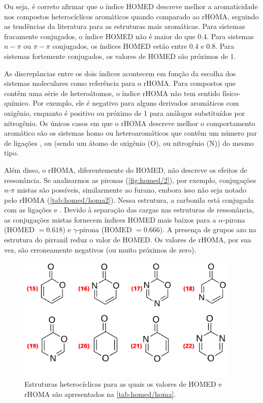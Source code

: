Ou seja, é correto afirmar que o índice \gls{HOMED} descreve melhor a aromaticidade nos compostos heterocíclicos aromáticos quando comparado ao \gls{rHOMA}, seguindo as tendências da literatura para as estruturas mais aromáticas. Para sistemas fracamente conjugados, o índice \gls{HOMED} não é maior do que 0.4. Para sistemas $n-\pi$ ou $\pi-\pi$ conjugados, os índices \gls{HOMED} estão entre 0.4 e 0.8. Para sistemas fortemente conjugados, os valores de \gls{HOMED} são próximos de 1.

As discrepâncias entre os dois índices acontecem em função da escolha dos sistemas moleculares como referência para o \gls{rHOMA}. Para compostos que contêm uma série de heteroátomos, o índice \gls{rHOMA} não tem sentido físico-químico. Por exemplo, ele é negativo para alguns derivados aromáticos com oxigênio, enquanto é positivo ou próximo de 1 para análogos substituídos por nitrogênio. Os únicos casos em que o \gls{rHOMA} descreve melhor o comportamento aromático são os sistemas homo ou heteroaromáticos que contêm um número par de ligações ,  ou  (sendo  um átomo de oxigênio (O), ou nitrogênio (N)) do mesmo tipo.

Além disso, o \gls{rHOMA}, diferentemente do \gls{HOMED}, não descreve os efeitos de ressonância. Se analisarmos as pironas (\autoref{fig:homed/2}), por exemplo, conjugações $n$-$\pi$ mistas são possíveis, similarmente ao furano, embora isso não seja notado pelo \gls{rHOMA} (\autoref{tab:homed/homa2}). Nessa estrutura, a carbonila está conjugada com as ligações  e . Devido à separação das cargas nas estruturas de ressonância, as conjugações mistas fornecem índices \gls{HOMED} mais baixos para a $\alpha$-pirona (\gls{HOMED} $=0.618$) e $\gamma$-pirona (\gls{HOMED} $=0.666$). A presença de grupos azo na estrutura do pirranil reduz o valor de \gls{HOMED}. Os valores de \gls{rHOMA}, por sua vez, são erroneamente negativos (ou muito próximos de zero).
\newpage

\begin{figure}[htb]
\caption{\label{fig:homed/2} Estruturas heterocíclicas para as quais os valores de \gls{HOMED} e \gls{rHOMA} são apresentados na \autoref{tab:homed/homa}.}
	\begin{center}
		\includegraphics[width=0.95\textwidth]{images/18.png}
	\end{center}
\end{figure}

